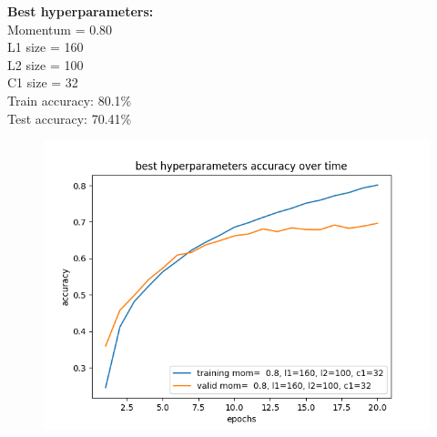 \documentclass{article}
\newcommand{\1}{\mathbf{1}}
\begin{document}
{\begin{figure}[h]
  \centering
\end{figure}

\newpage

\textbf{Best hyperparameters:} \\
Momentum = 0.80 \\
L1 size = 160 \\
L2 size = 100 \\
C1 size = 32 \\
Train accuracy: 80.1\% \\
Test accuracy: 70.41\%

\begin{figure}[h]
  \centering
  \includegraphics[width=130mm]{../hw3-code/results/a6d/a6_d_best.png}
\end{figure}

}
\end{document}
